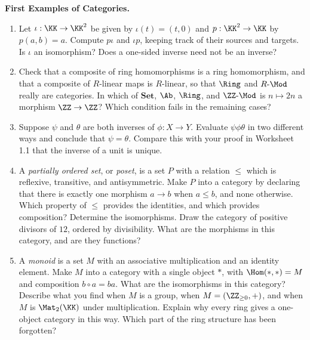 \documentclass[12pt,reqno]{amsart}
\begin{document}
\begin{problems}
\item\label{c:categories} \textbf{First Examples of Categories.}
\begin{enumerate}
\item Let $\iota:\KK\to\KK^2$ be given by $\iota(t)=(t,0)$ and $p:\KK^2\to\KK$ by $p(a,b)=a$. Compute $p\iota$ and $\iota p$, keeping track of their sources and targets. Is $\iota$ an isomorphism? Does a one-sided inverse need not be an inverse?
\item Check that a composite of ring homomorphisms is a ring homomorphism, and that a composite of $R$-linear maps is $R$-linear, so that $\Ring$ and $R\text{-}\Mod$ really are categories. In which of $\mathbf{Set}$, $\Ab$, $\Ring$, and $\ZZ\text{-}\Mod$ is $n\mapsto 2n$ a morphism $\ZZ\to\ZZ$? Which condition fails in the remaining cases?
\item Suppose $\psi$ and $\theta$ are both inverses of $\phi:X\to Y$. Evaluate $\psi\phi\theta$ in two different ways and conclude that $\psi=\theta$. Compare this with your proof in Worksheet 1.1 that the inverse of a unit is unique.
\item A \emph{partially ordered set}, or \emph{poset}, is a set $P$ with a relation $\leq$ which is reflexive, transitive, and antisymmetric. Make $P$ into a category by declaring that there is exactly one morphism $a\to b$ when $a\leq b$, and none otherwise. Which property of $\leq$ provides the identities, and which provides composition? Determine the isomorphisms. Draw the category of positive divisors of $12$, ordered by divisibility. What are the morphisms in this category, and are they functions?
\item A \emph{monoid} is a set $M$ with an associative multiplication and an identity element. Make $M$ into a category with a single object $\ast$, with $\Hom(\ast,\ast)=M$ and composition $b\circ a=ba$. What are the isomorphisms in this category? Describe what you find when $M$ is a group, when $M=(\ZZ_{\geq0},+)$, and when $M$ is $\Mat_2(\KK)$ under multiplication. Explain why every ring gives a one-object category in this way. Which part of the ring structure has been forgotten?
\end{enumerate}
\end{problems}

\hrulefill
\end{document}
